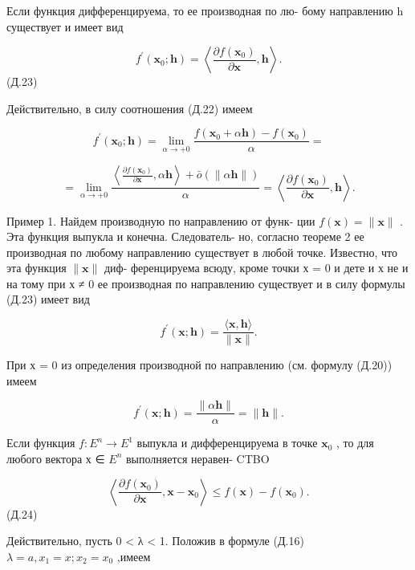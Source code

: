 \documentclass[8pt]{extarticle}
\begin{document}
Если функция дифференцируема, то ее производная по лю- бому направлению h существует и имеет вид

\[
{f}^{\prime }\left( {{\mathbf{x}}_{0};\mathbf{h}}\right)  = \left\langle  {\frac{\partial f\left( {\mathbf{x}}_{0}\right) }{\partial \mathbf{x}},\mathbf{h}}\right\rangle  .
\]
 (Д.23)

Действительно, в силу соотношения (Д.22) имеем

\[
{f}^{\prime }\left( {{\mathbf{x}}_{0};\mathbf{h}}\right)  = \mathop{\lim }\limits_{{\alpha  \rightarrow   + 0}}\frac{f\left( {{\mathbf{x}}_{0} + \alpha \mathbf{h}}\right)  - f\left( {\mathbf{x}}_{0}\right) }{\alpha } =
\]

\[
= \mathop{\lim }\limits_{{\alpha  \rightarrow   + 0}}\frac{\left\langle  {\frac{\partial f\left( {\mathbf{x}}_{0}\right) }{\partial \mathbf{x}},\alpha \mathbf{h}}\right\rangle   + \bar{o}\left( {\parallel \alpha \mathbf{h}\parallel }\right) }{\alpha } = \left\langle  {\frac{\partial f\left( {\mathbf{x}}_{0}\right) }{\partial \mathbf{x}},\mathbf{h}}\right\rangle  .
\]

Пример 1. Найдем производную по направлению от функ- ции \(f\left( \mathbf{x}\right)  = \parallel \mathbf{x}\parallel\) . Эта функция выпукла и конечна. Следователь- но, согласно теореме 2 ее производная по любому направлению существует в любой точке. Известно, что эта функция \(\parallel \mathbf{x}\parallel\) диф- ференцируема всюду, кроме точки х = 0 и дете и х не и на тому при х ≠ 0 ее производная по направлению существует и в силу формулы (Д.23) имеет вид

\[
{f}^{\prime }\left( {\mathbf{x};\mathbf{h}}\right)  = \frac{\langle \mathbf{x},\mathbf{h}\rangle }{\parallel \mathbf{x}\parallel }.
\]

При х = 0 из определения производной по направлению (см. формулу (Д.20)) имеем

\[
{f}^{\prime }\left( {\mathbf{x};\mathbf{h}}\right)  = \frac{\parallel \alpha \mathbf{h}\parallel }{\alpha } = \parallel \mathbf{h}\parallel .
\]

Если функция \(f : {E}^{n} \rightarrow  {E}^{1}\) выпукла и дифференцируема в точке \({\mathbf{x}}_{0}\) , то для любого вектора х ∈ \({E}^{n}\) выполняется неравен- CTBO

\[
\left\langle  {\frac{\partial f\left( {\mathbf{x}}_{0}\right) }{\partial \mathbf{x}},\mathbf{x} - {\mathbf{x}}_{0}}\right\rangle   \leq  f\left( \mathbf{x}\right)  - f\left( {\mathbf{x}}_{0}\right) .
\]
 (Д.24)

Действительно, пусть 0 < λ < 1. Положив в формуле (Д.16) \(\lambda  = a,{x}_{1} = x;{x}_{2} = {x}_{0}\) ,имеем
\end{document}
